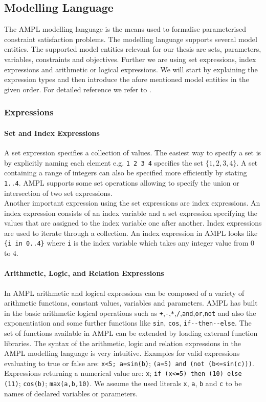 \subsection{Modelling Language}
The AMPL modelling language is the means used to formalise parameterised constraint satisfaction problems. 
The modelling language supports several model entities. The supported model entities relevant for our thesis are sets, parameters, variables, constraints and objectives. Further we are using set expressions, index expressions and arithmetic or logical expressions. We will start by explaining the expression types and then introduce the afore mentioned model entities in the given order. For detailed reference we refer to \cite{AMPL}.
\subsubsection{Expressions}
\paragraph{Set and Index Expressions}
A set expression specifies a collection of values. The easiest way to specify a set is by explicitly naming each element e.g. \verb&1 2 3 4& specifies the set $\lbrace 1,2,3,4\rbrace$. A set containing a range of integers can also be specified more efficiently by stating \verb&1..4&. AMPL supports some set operations allowing to specify the union or intersection of two set expressions.\\
Another important expression using the set expressions are index expressions. An index expression consists of an index variable and a set expression specifying the values that are assigned to the index variable one after another. Index expressions are used to iterate through a collection. An index expression in AMPL looks like \verb&{i in 0..4}& where \verb=i= is the index variable which takes any integer value from $0$ to $4$.
\paragraph{Arithmetic, Logic, and Relation Expressions}
In AMPL arithmetic and logical expressions can be composed of a variety of arithmetic functions, constant values, variables and parameters. AMPL has built in the basic arithmetic logical operations such as \verb=+=,\verb=-=,\verb=*=,\verb=/=,\verb=and=,\verb=or=,\verb=not= and also the exponentiation and some further functions like \verb=sin=, \verb=cos=, \verb=if--then--else=. The set of functions available in AMPL can be extended by loading external function libraries. The syntax of the arithmetic, logic and relation expressions in the AMPL modelling language is very intuitive. Examples for valid expressions evaluating to true or false are:
\verb&x<5; a=sin(b)&; \verb&(a=5) and (not (b<=sin(c)))&. Expressions returning a numerical value are: \verb&x&; \verb&if (x<=5) then (10) else (11)&; \verb&cos(b)&; \verb&max(a,b,10)&. 
We assume the used literals \verb=x=, \verb=a=, \verb=b= and \verb=c= to be names of declared variables or parameters.
